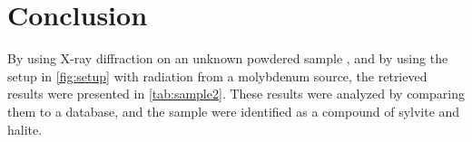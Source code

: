 

\section{Conclusion}


By using X-ray diffraction on an unknown powdered sample , and by using the setup in \autoref{fig:setup} with radiation from a molybdenum source, the retrieved results were presented in \autoref{tab:sample2}. These results were analyzed by comparing them to a database, and the sample were identified as a compound of sylvite and halite. 